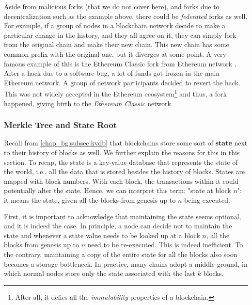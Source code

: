Aside from malicious forks (that we do not cover here), and forks due to decentralization such as
the example above, there could be \textit{federated} forks as well. For example, if a group of nodes
in a blockchain network decide to make a particular change in the history, and they all agree on it,
they can simply fork from the original chain and make their new chain. This new chain has some
common prefix with the original one, but it diverges at some point. A very famous example of this is
the Ethereum Classic fork from Ethereum network \cite{vignaGreatDigitalCurrencyDebate2016}. After a
hack due to a software bug, a lot of funds got frozen in the main Ethereum network. A group of
network participants decided to revert the hack. This was not widely accepted in the Ethereum
ecosystem\footnote{After all, it defies all the \textit{immutability} properties of a blockchain.}
and thus, a fork happened, giving birth to the \textit{Ethereum Classic} network.



\subsubsection{Merkle Tree and State Root} \label{chap_bg:subsec:trie}

Recall from \ref{chap_bg:subsec:kvdb} that blockchains store some sort of \textbf{state} next to
their history of blocks as well. We further explain the reasons for this in this section. To recap,
the state is a key-value database that represents the state of the world, i.e., all the data that is
stored besides the history of blocks. States are mapped with block numbers. With each block, the
transactions within it could potentially alter the state. Hence, we can interpret this term: "state
at block $n$": it means the  state, given all the blocks from genesis up to $n$ being executed.

First, it is important to acknowledge that maintaining the state seems optional, and it is indeed
the case. In principle, a node can decide not to maintain the state and whenever a state value needs
to be looked up at a block $n$, all the blocks from genesis up to $n$ need to be re-executed. This
is indeed inefficient. To the contrary, maintaining a copy of the entire state for all the blocks
also soon becomes a storage bottleneck. In practice, many chains adopt a middle-ground, in which
normal nodes store only the state associated with the last $k$ blocks.

